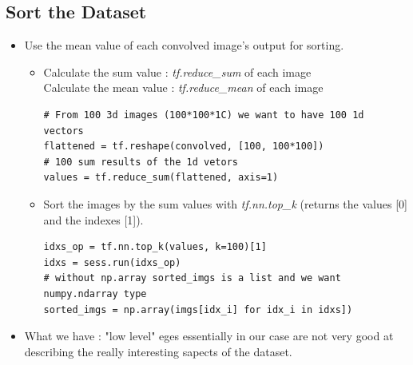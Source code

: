\documentclass[12pt,a4paper]{article}
\begin{document}
\subsection{Sort the Dataset}
\begin{itemize}
\item Use the mean value of each convolved image's output for sorting.
\begin{itemize}
\item Calculate the sum value : \textit{tf.reduce\_sum} of each image\\
Calculate the mean value : \textit{tf.reduce\_mean} of each image
\begin{lstlisting}
# From 100 3d images (100*100*1C) we want to have 100 1d vectors
flattened = tf.reshape(convolved, [100, 100*100])
# 100 sum results of the 1d vetors
values = tf.reduce_sum(flattened, axis=1)
\end{lstlisting}
\item Sort the images by the sum values with \textit{tf.nn.top\_k} (returns the values [0] and the indexes [1]).
\begin{lstlisting}
idxs_op = tf.nn.top_k(values, k=100)[1]
idxs = sess.run(idxs_op)
# without np.array sorted_imgs is a list and we want numpy.ndarray type
sorted_imgs = np.array(imgs[idx_i] for idx_i in idxs])
\end{lstlisting}
\end{itemize}
\item What we have : "low level" eges essentially in our case are not very good at describing the really interesting sapects of the dataset.
\end{itemize}
\end{document}
